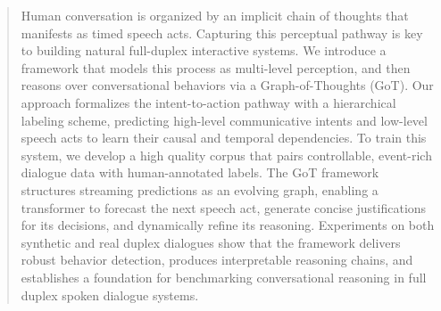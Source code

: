 \begin{abstract}
Human conversation is organized by an implicit chain of thoughts that manifests as timed speech acts. Capturing this perceptual pathway is key to building natural full-duplex interactive systems. We introduce a framework that models this process as multi-level perception, and then reasons over conversational behaviors via a Graph-of-Thoughts (GoT). Our approach formalizes the intent-to-action pathway with a hierarchical labeling scheme, predicting high-level communicative intents and low-level speech acts to learn their causal and temporal dependencies. To train this system, we develop a high quality corpus that pairs controllable, event-rich dialogue data with human-annotated labels. The GoT framework structures streaming predictions as an evolving graph, enabling a  transformer to forecast the next speech act, generate concise justifications for its decisions, and dynamically refine its reasoning. Experiments on both synthetic and real duplex dialogues show that the framework delivers robust behavior detection, produces interpretable reasoning chains, and establishes a foundation for benchmarking conversational reasoning in full duplex spoken dialogue systems.
\end{abstract}